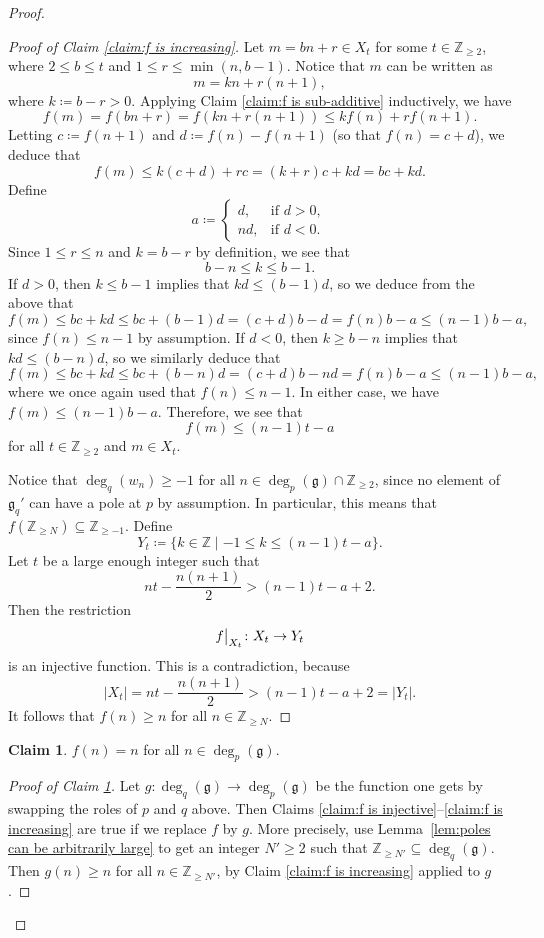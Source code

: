 \documentclass[12pt]{amsart}
\theoremstyle{plain}
\theoremstyle{definition}
\newtheorem{claim}{Claim}
\numberwithin{equation}{section}
\def\g{\mathfrak{g}}
\def\ZZ{\mathbb{Z}}
\newcommand\restr[2]{{\left.\kern-\nulldelimiterspace #1 \vphantom{\big|} \right|_{#2}}}
\begin{document}
\begin{proof}
\begin{proof}[Proof of Claim \ref{claim:f is increasing}]
        Let $m = b n + r \in X_t$ for some $t \in \ZZ_{\geq 2}$, where $2 \leq b \leq t$ and $1 \leq r \leq \min(n, b - 1)$. Notice that $m$ can be written as
        $$m = k n + r(n + 1),$$
        where $k \coloneqq b - r > 0$. Applying Claim \ref{claim:f is sub-additive} inductively, we have
        $$f(m) = f(b n + r) = f(k n + r (n + 1)) \leq k f(n) + r f(n + 1).$$
        Letting $c \coloneqq f(n + 1)$ and $d \coloneqq f(n) - f(n + 1)$ (so that $f(n) = c + d$), we deduce that
        $$f(m) \leq k(c + d) + rc = (k + r)c + kd = b c + kd.$$
        Define
        $$a \coloneqq \begin{cases}
            d, &\text{if } d > 0, \\
            nd, &\text{if } d < 0.
        \end{cases}$$
        Since $1 \leq r \leq n$ and $k = b - r$ by definition, we see that
        $$b - n \leq k \leq b - 1.$$
        If $d > 0$, then $k \leq b - 1$ implies that $kd \leq (b - 1)d$, so we deduce from the above that
        $$f(m) \leq bc + kd \leq bc + (b - 1)d = (c + d)b - d = f(n)b - a \leq (n - 1)b - a,$$
        since $f(n) \leq n - 1$ by assumption. If $d < 0$, then $k \geq b - n$ implies that $kd \leq (b - n)d$, so we similarly deduce that
        $$f(m) \leq bc + kd \leq bc + (b - n)d = (c + d)b - nd = f(n)b - a \leq (n - 1)b - a,$$
        where we once again used that $f(n) \leq n - 1$. In either case, we have $f(m) \leq (n - 1)b - a$. Therefore, we see that
        $$f(m) \leq (n - 1)t - a$$
        for all $t \in \ZZ_{\geq 2}$ and $m \in X_t$.

        Notice that $\deg_q(w_n) \geq -1$ for all $n \in \deg_p(\g) \cap \ZZ_{\geq 2}$, since no element of $\g_q'$ can have a pole at $p$ by assumption. In particular, this means that $f(\ZZ_{\geq N}) \subseteq \ZZ_{\geq -1}$. Define
        $$Y_t \coloneqq \{k \in \ZZ \mid -1 \leq k \leq (n - 1)t - a\}.$$
        Let $t$ be a large enough integer such that
        $$nt - \frac{n(n + 1)}{2} > (n - 1)t - a + 2.$$
        Then the restriction
        $$\restr{f}{X_t} \colon X_t \to Y_t$$
        is an injective function. This is a contradiction, because
        $$|X_t| = nt - \frac{n(n + 1)}{2} > (n - 1)t - a + 2 = |Y_t|.$$
        It follows that $f(n) \geq n$ for all $n \in \ZZ_{\geq N}$.
    \end{proof}

    \begin{claim}\label{claim:f is the identity}
        $f(n) = n$ for all $n \in \deg_p(\g)$.
    \end{claim}
    \begin{proof}[Proof of Claim \ref{claim:f is the identity}]
        Let $g \colon \deg_q(\g) \to \deg_p(\g)$ be the function one gets by swapping the roles of $p$ and $q$ above. Then Claims \ref{claim:f is injective}--\ref{claim:f is increasing} are true if we replace $f$ by $g$. More precisely, use Lemma~\ref{lem:poles can be arbitrarily large} to get an integer $N' \geq 2$ such that $\ZZ_{\geq N'} \subseteq \deg_q(\g)$. Then $g(n) \geq n$ for all $n \in \ZZ_{\geq N'}$, by Claim \ref{claim:f is increasing} applied to $g$.


\end{proof}
\end{proof}
\end{document}
